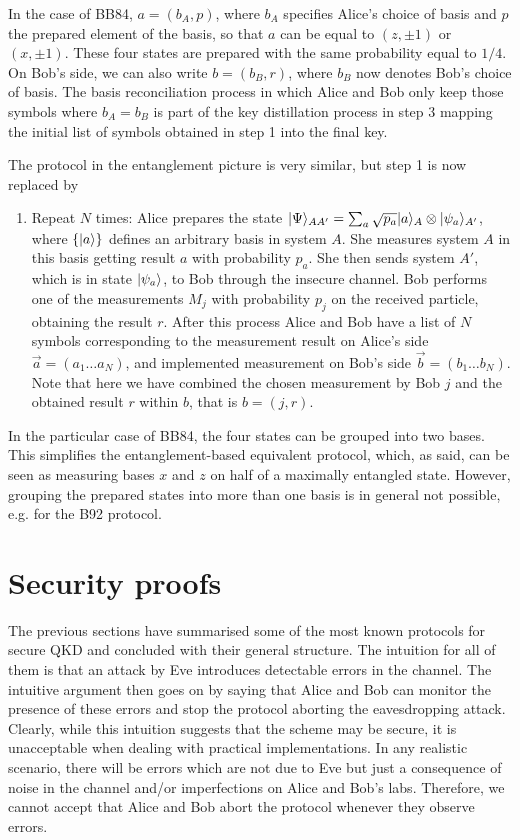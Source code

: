 \documentclass[a4paper]{article}
\begin{document}
In the case of BB84, $a=(b_A,p)$, where $b_A$ specifies Alice's choice of basis and $p$ the prepared element of the basis, so that $a$ can be equal to $(z,\pm 1)$ or $(x,\pm 1)$. These four states are prepared with the same probability equal to $1/4$. On Bob's side, we can also write $b=(b_B,r)$, where $b_B$ now denotes Bob's choice of basis. The basis reconciliation process in which Alice and Bob only keep those symbols where $b_A=b_B$ is part of the key distillation process in step 3 mapping the initial list of symbols obtained in step 1 into the final key.

The protocol in the entanglement picture is very similar, but step 1 is now replaced by 
\begin{enumerate}
    \item Repeat $N$ times: Alice prepares the state $|\Psi\rangle_{AA'}=\sum_a \sqrt{p_a}|a\rangle_A\otimes|\psi_a\rangle_{A'}$, where $\{|a\rangle\}$ defines an arbitrary basis in system $A$. She measures system $A$ in this basis getting result $a$ with probability $p_a$. She then sends system $A'$, which is in state $|\psi_a\rangle$, to Bob through the insecure channel. Bob performs one of the measurements $M_j$ with probability $p_j$ on the received particle, obtaining the result $r$. After this process Alice and Bob have a list of $N$ symbols corresponding to the measurement result on Alice's side $\vec a=(a_1\ldots a_N)$, and implemented measurement on Bob's side $\vec b=(b_1\ldots b_N)$. Note that here we have combined the chosen measurement by Bob $j$ and the obtained result $r$ within $b$, that is $b=(j,r)$.
\end{enumerate}
In the particular case of BB84, the four states can be grouped into two bases. This simplifies the entanglement-based equivalent protocol, which, as said, can be seen as measuring bases $x$ and $z$ on half of a maximally entangled state. However, grouping the prepared states into more than one basis is in general not possible, e.g. for the B92 protocol.

\section{Security proofs}

The previous sections have summarised some of the most known
protocols for secure QKD and concluded with their general structure. The intuition for all of them is that
an attack by Eve introduces detectable errors in the channel. 
The intuitive argument then goes on by saying that Alice and Bob can monitor the
presence of these errors and stop the protocol aborting the
eavesdropping attack. Clearly, while this intuition suggests that
the scheme may be secure, it is unacceptable when dealing with
practical implementations. In any realistic scenario, there will
be errors which are not due to Eve but just a consequence of noise
in the channel and/or imperfections on Alice and Bob's labs.
Therefore, we cannot accept that Alice and Bob abort the protocol
whenever they observe errors.
\end{document}
